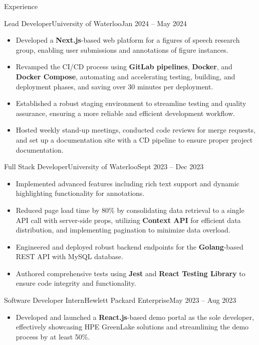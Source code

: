 \begin{cvsection}{Experience}
  \begin{cvsubsection}{Lead Developer}{University of Waterloo}{Jan 2024 -- May 2024}	
    \begin{itemize}
      \item Developed a \textbf{Next.js}-based web platform for a figures of speech research group, enabling user submissions and annotations of figure instances.
      \item Revamped the CI/CD process using \textbf{GitLab pipelines}, \textbf{Docker}, and \textbf{Docker Compose}, automating and accelerating testing, building, and deployment phases, and saving over 30 minutes per deployment.
      \item Established a robust staging environment to streamline testing and quality assurance, ensuring a more reliable and efficient development workflow.
      \item Hosted weekly stand-up meetings, conducted code reviews for merge requests, and set up a documentation site with a CD pipeline to ensure proper project documentation.
    \end{itemize}	
  \end{cvsubsection}
  \begin{cvsubsection}{Full Stack Developer}{University of Waterloo}{Sept 2023 -- Dec 2023}
    \begin{itemize}
      \item Implemented advanced features including rich text support and dynamic highlighting functionality for annotations.
      \item Reduced page load time by 80\% by consolidating data retrieval to a single API call with server-side props, utilizing \textbf{Context API} for efficient data distribution, and implementing pagination to minimize data overload.
      \item Engineered and deployed robust backend endpoints for the \textbf{Golang}-based REST API with MySQL database.
      \item Authored comprehensive tests using \textbf{Jest} and \textbf{React Testing Library} to ensure code integrity and functionality.
    \end{itemize}
  \end{cvsubsection}
  \begin{cvsubsection}{Software Developer Intern}{Hewlett Packard Enterprise}{May 2023 -- Aug 2023}	
    \begin{itemize}
      \item Developed and launched a \textbf{React.js}-based demo portal as the sole developer, effectively showcasing HPE GreenLake solutions and streamlining the demo process by at least 50\%.

\end{itemize}
\end{cvsubsection}
\end{cvsection}

